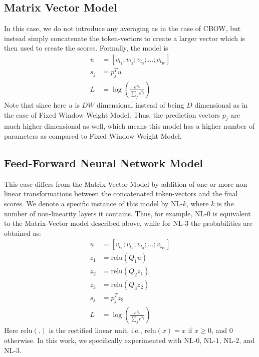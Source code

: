 \subsection{Matrix Vector Model}
In this case, we do not introduce any averaging as in the case of CBOW, but
instead simply concatenate the token-vectors to create a larger vector which is
then used to create the scores. Formally, the model is
\begin{align}
u &= [v_{t_1}; v_{t_2}; v_{t_3}; \ldots; v_{t_W}]\\
s_j &= p_j^Tu\\
L &= \log\left(\frac{e^{s_{t_o}}}{\sum_j{e^{s_j}}}\right)
\end{align}
Note that since here $u$ is $DW$ dimensional instead of being $D$ dimensional as
in the case of Fixed Window Weight Model. Thus, the prediction vectors $p_j$ are
much higher dimensional as well, which means this model has a higher number
of parameters as compared to Fixed Window Weight Model.

\subsection{Feed-Forward Neural Network Model}
\label{sec:nnlm}
This case differs from the Matrix Vector Model by addition of one or more
non-linear transformations between the concatenated token-vectors and the final
scores. We denote a specific instance of this model by NL-$k$, where $k$ is the
number of non-linearity layers it contains. Thus, for example, NL-$0$ is
equivalent to the Matrix-Vector model described above, while for NL-$3$ the
probabilities are obtained as:
\begin{align}
u &= [v_{t_1}; v_{t_2}; v_{t_3}; \ldots; v_{t_W}]\\
z_1 &= \text{relu}(Q_1u)\\
z_2 &= \text{relu}(Q_2z_1)\\
z_3 &= \text{relu}(Q_3z_2)\\
s_j &= p_j^Tz_3\\
L &= \log\left(\frac{e^{s_{t_o}}}{\sum_j{e^{s_j}}}\right)
\end{align}
Here $\text{relu}(.)$ is the rectified linear unit, i.e., $\text{relu}(x) = x$
if $x \geq 0$, and $0$ otherwise. In this work, we specifically experimented
with NL-$0$, NL-$1$, NL-$2$, and NL-$3$.

